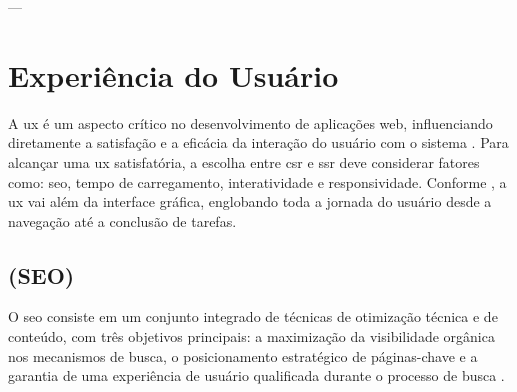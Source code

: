 ---

\section{Experiência do Usuário}
\label{sec:ux}
A \acrfull{ux} é um aspecto crítico no desenvolvimento de aplicações web, influenciando diretamente a satisfação e a eficácia da interação do usuário com o sistema \cite{atori2023}. Para alcançar uma \acrshort{ux} satisfatória, a escolha entre \acrshort{csr} e \acrshort{ssr} deve considerar fatores como: {\acrshort{seo}}, tempo de carregamento, interatividade e responsividade.
Conforme , a \acrshort{ux} vai além da interface gráfica, englobando toda a jornada do usuário desde a navegação até a conclusão de tarefas. 

\subsection{ (SEO)}
\label{sec:seo}
O \acrfull{seo} consiste em um conjunto integrado de técnicas de otimização técnica e de conteúdo, com três objetivos principais: a maximização da visibilidade orgânica nos mecanismos de busca, o posicionamento estratégico de páginas-chave e a garantia de uma experiência de usuário qualificada durante o processo de busca \cite{conor2022}.




\label{s2}


